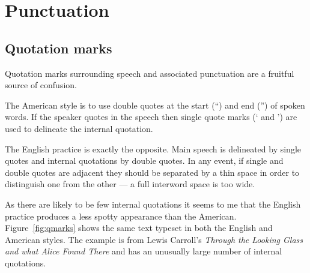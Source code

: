 \documentclass[10pt,a4paper,extrafontsizes]{memoir}
\begin{document}

\section{Punctuation}

\subsection{Quotation marks}


\begin{paracol}{2}
\switchEng
    Quotation marks surrounding speech and associated punctuation 
are a fruitful source of confusion.

    The American style is to use double quotes at the start (``) and 
end ('') of spoken words. If the speaker quotes in the speech then single
quote marks (` and ') are used to delineate the internal quotation.

    The English practice is exactly the opposite. Main speech is delineated
by single quotes and internal quotations by double quotes. 
In any event,
if single and double quotes are adjacent they should be separated by a thin
space in order to distinguish one from the other --- 
a full interword space is too wide.

    As there are likely to be few internal quotations 
it seems to me that
the English practice produces a less spotty appearance than the American.
Figure~\ref{fig:qmarks} shows the same text typeset in both the English
and American styles. The example is from Lewis Carroll's 
\emph{Through the Looking Glass and what Alice Found There} 
and has an unusually large number of internal quotations. 
\end{paracol}
\end{document}

